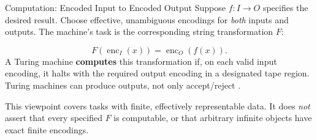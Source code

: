 \documentclass[10pt]{beamer}
\begin{document}
\begin{frame}{Computation: Encoded Input to Encoded Output}
  \small
  Suppose $f:I\to O$ specifies the desired result. Choose effective,
  unambiguous encodings for \emph{both} inputs and outputs. The machine's
  task is the corresponding string transformation $F$:
  \begin{center}
  \end{center}
  \[
    F(\operatorname{enc}_I(x))=\operatorname{enc}_O(f(x)).
  \]
  \pause
  A Turing machine \textbf{computes} this transformation if, on each valid
  input encoding, it halts with the required output encoding in a designated
  tape region. Turing machines can produce outputs, not only accept/reject
  \cite{tm-functions}.
  \pause
  \par\smallskip
  This viewpoint covers tasks with finite, effectively representable data.
  It does \emph{not} assert that every specified $F$ is computable, or that
  arbitrary infinite objects have exact finite encodings.
\end{frame}
\end{document}
